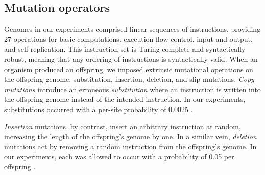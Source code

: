 \subsection{Mutation operators}

Genomes in our experiments comprised linear sequences of instructions, providing 27 operations for basic computations, execution flow control, input and output, and self-replication.
This instruction set is Turing complete and syntactically robust, meaning that any ordering of instructions is syntactically valid.
When an organism produced an offspring, we imposed extrinsic mutational operations on the offspring genome: substitution, insertion, deletion, and slip mutations.
\textit{Copy mutations} introduce an erroneous \textit{substitution} where an instruction is written into the offspring genome instead of the intended instruction.
In our experiments, substitutions occurred with a per-site probability of 0.0025 \citep{lenski2003evolutionary}.

\textit{Insertion} mutations, by contrast, insert an arbitrary instruction at random, increasing the length of the offspring's genome by one.
In a similar vein, \textit{deletion} mutations act by removing a random instruction from the offspring's genome.
In our experiments, each was allowed to occur with a probability of 0.05 per offspring \citep{lenski2003evolutionary}.

